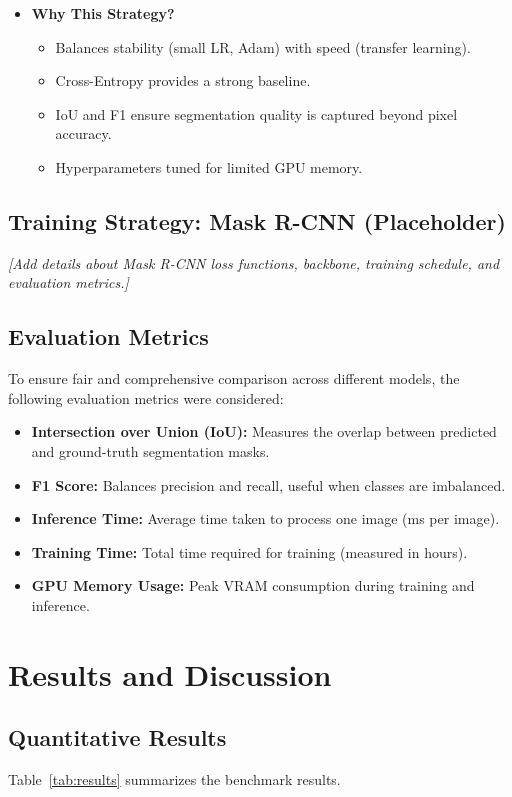 \documentclass[rnd]{mas_proposal}
\begin{document}
\begin{itemize}
    \item \textbf{Why This Strategy?}  
    \begin{itemize}
        \item Balances stability (small LR, Adam) with speed (transfer learning). 
        \item Cross-Entropy provides a strong baseline. 
        \item IoU and F1 ensure segmentation quality is captured beyond pixel accuracy. 
        \item Hyperparameters tuned for limited GPU memory. 
    \end{itemize}
\end{itemize}


\subsection{Training Strategy: Mask R-CNN (Placeholder)}
\textit{[Add details about Mask R-CNN loss functions, backbone, training schedule, and evaluation metrics.]}

\subsection{Evaluation Metrics}
To ensure fair and comprehensive comparison across different models, 
the following evaluation metrics were considered:
\begin{itemize}
    \item \textbf{Intersection over Union (IoU):} Measures the overlap between predicted and ground-truth segmentation masks.  
    \item \textbf{F1 Score:} Balances precision and recall, useful when classes are imbalanced.  
    \item \textbf{Inference Time:} Average time taken to process one image (ms per image).  
    \item \textbf{Training Time:} Total time required for training (measured in hours).  
    \item \textbf{GPU Memory Usage:} Peak VRAM consumption during training and inference.  
\end{itemize}

\section{Results and Discussion}

\subsection{Quantitative Results}
Table~\ref{tab:results} summarizes the benchmark results.
\end{document}
